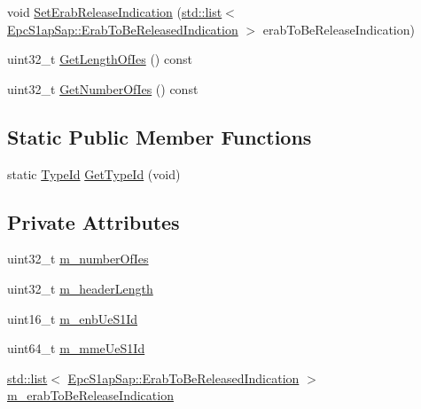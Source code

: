 \begin{DoxyCompactItemize}
\item 
void \hyperlink{classns3_1_1EpcS1APErabReleaseIndicationHeader_a5fac0f3097177616eb91c98b59e4688e}{Set\+Erab\+Release\+Indication} (\hyperlink{openflow-interface_8h_afd9bcfa176617760671b67580f536fa7}{std\+::list}$<$ \hyperlink{structns3_1_1EpcS1apSap_1_1ErabToBeReleasedIndication}{Epc\+S1ap\+Sap\+::\+Erab\+To\+Be\+Released\+Indication} $>$ erab\+To\+Be\+Release\+Indication)
\item 
uint32\+\_\+t \hyperlink{classns3_1_1EpcS1APErabReleaseIndicationHeader_ae168cf4afb160ea5b999ef45cc302002}{Get\+Length\+Of\+Ies} () const 
\item 
uint32\+\_\+t \hyperlink{classns3_1_1EpcS1APErabReleaseIndicationHeader_aca139c7a37a5ef252aa53bd6a4df5bf8}{Get\+Number\+Of\+Ies} () const 
\end{DoxyCompactItemize}
\subsection*{Static Public Member Functions}
\begin{DoxyCompactItemize}
\item 
static \hyperlink{classns3_1_1TypeId}{Type\+Id} \hyperlink{classns3_1_1EpcS1APErabReleaseIndicationHeader_a93651c0b2cc62e23442f4beee2ee2898}{Get\+Type\+Id} (void)
\end{DoxyCompactItemize}
\subsection*{Private Attributes}
\begin{DoxyCompactItemize}
\item 
uint32\+\_\+t \hyperlink{classns3_1_1EpcS1APErabReleaseIndicationHeader_aa5d8a46828711733ab059df76c2d044d}{m\+\_\+number\+Of\+Ies}
\item 
uint32\+\_\+t \hyperlink{classns3_1_1EpcS1APErabReleaseIndicationHeader_acc034283afa91cb4d6f2be45f06162fc}{m\+\_\+header\+Length}
\item 
uint16\+\_\+t \hyperlink{classns3_1_1EpcS1APErabReleaseIndicationHeader_a67f7a5e5fe5af1f86c896405facb42be}{m\+\_\+enb\+Ue\+S1\+Id}
\item 
uint64\+\_\+t \hyperlink{classns3_1_1EpcS1APErabReleaseIndicationHeader_a6ebc0b058731c1c7627c9f793a0e7451}{m\+\_\+mme\+Ue\+S1\+Id}
\item 
\hyperlink{openflow-interface_8h_afd9bcfa176617760671b67580f536fa7}{std\+::list}$<$ \hyperlink{structns3_1_1EpcS1apSap_1_1ErabToBeReleasedIndication}{Epc\+S1ap\+Sap\+::\+Erab\+To\+Be\+Released\+Indication} $>$ \hyperlink{classns3_1_1EpcS1APErabReleaseIndicationHeader_a3e8928dee7b43295dcc8f46e17e5c8a3}{m\+\_\+erab\+To\+Be\+Release\+Indication}
\end{DoxyCompactItemize}
